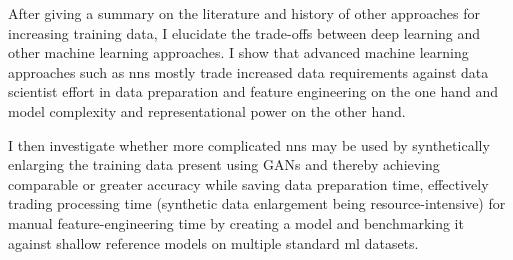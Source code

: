 
After giving a summary on the literature and history of other approaches for increasing training data, I elucidate the trade-offs between deep learning and other machine learning approaches. I show that advanced machine learning approaches such as \acp{nn} mostly trade increased data requirements against data scientist effort in data preparation and feature engineering on the one hand and model complexity and representational power on the other hand.

I then investigate whether more complicated \acp{nn} may be used by synthetically enlarging the training data present using \acp{GAN} and thereby achieving comparable or greater accuracy while saving data preparation time, effectively trading processing time (synthetic data enlargement being resource-intensive) for manual feature-engineering time by creating a model and benchmarking it against shallow reference models on multiple standard \ac{ml} datasets.

